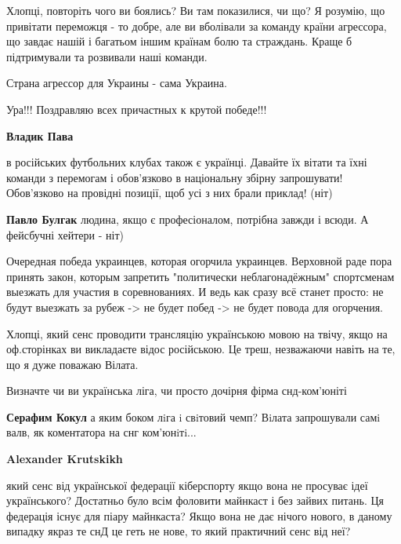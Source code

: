 \begin{itemize}

Хлопці, повторіть чого ви боялись?
Ви там показилися, чи що?
Я розумію, що привітати переможця - то добре, але ви вболівали за команду країни агрессора, що завдає нашій і багатьом іншим країнам болю та страждань.
Краще б підтримували та розвивали наші команди.

Страна агрессор для Украины - сама Украина.

Ура!!! Поздравляю всех причастных к крутой победе!!!

\textbf{Владик Пава} 

в російських футбольних клубах також є українці. Давайте їх вітати та їхні
команди з перемогам і обов'язково в національну збірну запрошувати! Обов'язково
на провідні позиції, щоб усі з них брали приклад! (ніт)

\begin{itemize} %
\textbf{Павло Булгак} людина, якщо є професіоналом, потрібна завжди і всюди. А фейсбучні хейтери - ніт)
\end{itemize} %


Очередная победа украинцев, которая огорчила украинцев.
Верховной раде пора принять закон, которым запретить "политически неблагонадёжным" спортсменам выезжать для участия в соревнованиях.
И ведь как сразу всё станет просто: не будут выезжать за рубеж -> не будет побед -> не будет повода для огорчения.


Хлопці, який сенс проводити трансляцію українською мовою на твічу, якщо на
оф.сторінках ви викладаєте відос російською. Це треш, незважаючи навіть на те,
що я дуже поважаю Вілата.

Визначте чи ви українська ліга, чи просто дочірня фірма снд-ком'юніті

\begin{itemize} %
\textbf{Серафим Кокул} а яким боком лiга i свiтовий чемп? Вiлата запрошували самi валв, як коментатора на снг ком’юнiтi...

\begin{itemize} %
\textbf{Alexander Krutskikh} 

який сенс від української федерації кіберспорту якщо вона не просуває ідеї
українського? Достатньо було всім фоловити майнкаст і без зайвих питань. Ця
федерація існує для піару майнкаста? Якщо вона не дає нічого нового, в даному
випадку якраз те снД це геть не нове, то який практичний сенс від неї?


\end{itemize}
\end{itemize}
\end{itemize}
